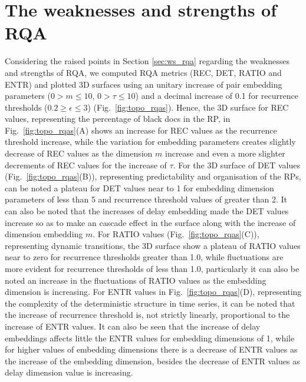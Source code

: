 \section{The weaknesses and strengths of RQA}
Considering the raised points in Section \ref{sec:ws_rqa} regarding 
the weaknesses and strengths of RQA, we computed RQA metrics 
(REC, DET, RATIO and ENTR) and plotted 3D surfaces using an unitary 
increase of pair embedding parameters 
($0 > m \le 10$, $0 > \tau \le 10$) 
and a decimal increase of 0.1 for recurrence thresholds 
($ 0.2 \ge \epsilon \le 3 $) (Fig.~\ref{fig:topo_rqas}). 
Hence, the 3D surface for REC values, representing the percentage of 
black docs in the RP, in Fig.~\ref{fig:topo_rqas}(A)
shows an increase for REC values as the recurrence threshold increase,
while the variation for embedding parameters creates slightly decrease 
of REC values as the dimension $m$ increase and even a more slighter 
decrements of REC values for the increase of $\tau$.
For the 3D surface of DET values (Fig.~\ref{fig:topo_rqas}(B)), representing 
predictability and organisation of the RPs, can be noted a plateau
for DET values near to 1 for embedding dimension parameters of less 
than 5 and recurrence threshold values of greater than 2. 
It can also be noted that the increases of delay embedding made 
the DET values increase so as to make an cascade effect in the surface 
along with the increase of dimension embedding $m$.
For RATIO values (Fig.~\ref{fig:topo_rqas}(C)),
representing dynamic transitions, the 3D surface show a plateau of RATIO values 
near to zero for recurrence thresholds greater than 1.0, while 
fluctuations are more evident for recurrence thresholds of less than 1.0,
particularly it can also be noted an increase in the fluctuations of 
RATIO values as the embedding dimension is increasing. 
For ENTR values in Fig.~\ref{fig:topo_rqas}(D), 
representing the complexity of the deterministic structure in time series, 
it can be noted that the increase of recurrence threshold is, 
not strictly linearly, proportional to the increase of ENTR values. 
It can also be seen that the increase of delay embeddings affects 
little the ENTR values for embedding dimensions of 1, while 
for higher values of embedding dimensions 
there is a decrease of ENTR values as the increase of the embedding dimension,
besides the decrease of ENTR values as delay dimension value is increasing.

